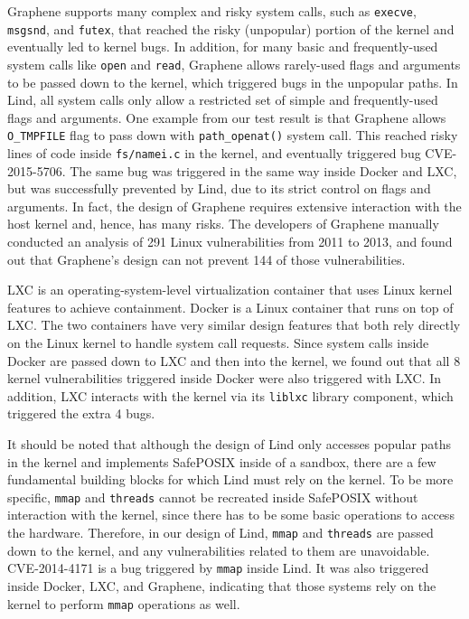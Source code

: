 {{{Graphene supports many complex and risky system calls, such as \texttt{execve}, \texttt{msgsnd}, and \texttt{futex},
that reached the risky (unpopular) portion of the kernel and eventually led to kernel bugs.
In addition, for many basic and frequently-used system calls like \texttt{open} and \texttt{read},
Graphene allows rarely-used flags and arguments to be passed down to the kernel, which triggered bugs in
the unpopular paths.
In Lind, all system calls only allow a restricted set of simple and frequently-used flags and arguments.
One example from our test result is that Graphene allows \texttt{O\_TMPFILE} flag to pass down with
\texttt{path\_openat()} system call. This reached risky lines of code inside \texttt{fs/namei.c} in the kernel,
and eventually triggered bug CVE-2015-5706.
The same bug was triggered in the same way inside Docker and LXC, but was successfully prevented by Lind,
due to its strict control on flags and arguments.
In fact, the design of Graphene requires extensive interaction
with the host kernel and, hence, has many risks. The developers of Graphene manually conducted
an analysis of 291 Linux vulnerabilities from 2011 to 2013, and found out that Graphene's design can not prevent 144 of those vulnerabilities.

LXC \cite{LXC} is an operating-system-level virtualization container that uses Linux kernel features to achieve containment.
Docker \cite{Docker} is a Linux container that runs on top of LXC. The two containers have very similar design features
that both rely directly on the Linux kernel to handle system call requests. Since system calls inside Docker are passed down
to LXC and then into the kernel, we found out that all 8 kernel vulnerabilities triggered inside Docker were also triggered
with LXC. In addition, LXC interacts with the kernel via its \texttt{liblxc} library component, which triggered the extra 4 bugs.

It should be noted that although the design of Lind only accesses popular paths in the kernel and implements SafePOSIX inside
of a sandbox, there are a few fundamental building blocks for which Lind must rely on the kernel. To be more specific,
\texttt{mmap} and \texttt{threads} cannot be recreated inside SafePOSIX without interaction with the kernel, since there has
to be some basic operations to access the hardware. Therefore, in our design of Lind, \texttt{mmap} and \texttt{threads}
are passed down to the kernel, and any vulnerabilities related to them are  unavoidable.
CVE-2014-4171 is a bug triggered by \texttt{mmap} inside Lind. It was also triggered inside Docker, LXC, and Graphene, indicating
that those systems rely on the kernel to perform \texttt{mmap} operations as well.

}}}

